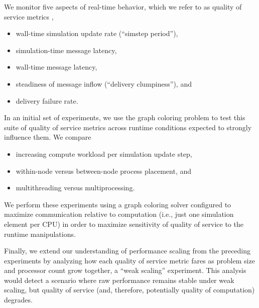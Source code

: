 We monitor five aspects of real-time behavior, which we refer to as quality of service metrics \citep{karakus2017quality},
\begin{itemize}
  \item wall-time simulation update rate (``simstep period''),
  \item simulation-time message latency,
  \item wall-time message latency,
  \item steadiness of message inflow (``delivery clumpiness''), and
  \item delivery failure rate.
\end{itemize}

In an initial set of experiments, we use the graph coloring problem to test this suite of quality of service metrics across runtime conditions expected to strongly influence them.
We compare
\begin{itemize}
  \item increasing compute workload per simulation update step,
  \item within-node versus between-node process placement, and
  \item multithreading versus multiprocessing.
\end{itemize}
We perform these experiments using a graph coloring solver configured to maximize communication relative to computation (i.e., just one simulation element per CPU) in order to maximize sensitivity of quality of service to the runtime manipulations.

Finally, we extend our understanding of performance scaling from the preceding experiments by analyzing how each quality of service metric fares as problem size and processor count grow together, a ``weak scaling'' experiment.
This analysis would detect a scenario where raw performance remains stable under weak scaling, but quality of service (and, therefore, potentially quality of computation) degrades.
